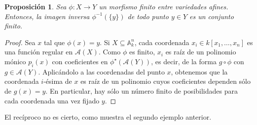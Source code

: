 \documentclass[a4paper,10pt]{book}
\newtheorem{prop}[thm]{Proposición}
\newcommand{\AAA}{\mathbb A}
\newcommand{\Ank}{\AAA^n_k}
\newcommand{\calA}{{\mathcal A}}
\begin{document}
\begin{prop}
 Sea $\phi:X\to Y$ un morfismo finito entre variedades afines. Entonces, la imagen inversa $\phi^{-1}(\{y\})$ de todo punto $y\in Y$ es un conjunto finito.
\end{prop}

\begin{proof}
 Sea $x$ tal que $\phi(x)=y$. Si $X\subseteq\Ank$, cada coordenada $x_i\in k[x_1,\ldots,x_n]$ es una función regular en $\calA(X)$. Como $\phi$ es finito, $x_i$ es raíz de un polinomio mónico $p_i(x)$ con coeficientes en $\phi^\star(\calA(Y))$, es decir, de la forma $g\circ\phi$ con $g\in\calA(Y)$. Aplicándolo a las coordenadas del punto $x$, obtenemos que la coordenada $i$-ésima de $x$ es raíz de un polinomio cuyos coeficientes dependen sólo de $g(x)=y$. En particular, hay sólo un número finito de posibilidades para cada coordenada una vez fijado $y$.
\end{proof}

El recíproco no es cierto, como muestra el segundo ejemplo anterior.
\end{document}
